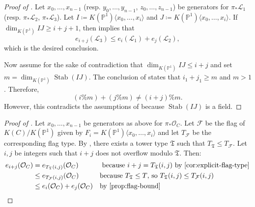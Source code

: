 \documentclass[letterpaper,10pt]{amsart}
\DeclareMathOperator{\Stab}{Stab}
\newcommand{\cO}{\mathcal{O}}      %
\newcommand{\PP}{\mathbb{P}}      %
\newcommand{\mfT}{\mathfrak{T}}
\newcommand{\la}{\langle}
\newcommand{\ra}{\rangle}
\newcommand{\cF}{\mathcal{F}}
\newcommand{\cL}{\mathcal{L}}
\theoremstyle{definition}
\theoremstyle{remark}
\begin{document}
\begin{proof}[Proof of ]
Let $x_0,\dots,x_{n-1}$ (resp. $y_0,\dots,y_{n-1}$, $z_0,\dots,z_{n-1}$) be generators for $\pi_* \cL_1$ (resp. $\pi_* \cL_2$, $\pi_* \cL_3$). Let $I \coloneqq K(\PP^1)\langle x_0,\dots,x_i\rangle$ and $J \coloneqq K(\PP^1)\langle x_0,\dots,x_i\rangle$. If $\dim_{K(\PP^1)}IJ \geq i + j + 1$, then  implies that
\[
    e_{i+j}(\cL_3) \leq e_i(\cL_1)+e_j(\cL_2),
\]
which is the desired conclusion. 

Now assume for the sake of contradiction that $\dim_{K(\PP^1)}IJ \leq i + j$ and set $m = \dim_{K(\PP^1)}\Stab(IJ)$.  The conclusion of  states that $i_1 + j_1 \geq m$ and $m > 1$. Therefore,   
\[
    (i\%m) + (j\%m) \neq (i + j)\%m.
\]
However, this contradicts the assumptions of  because $\Stab(IJ)$ is a field.
\end{proof}

\begin{proof}[Proof of ]
Let $x_0,\dots,x_{n-1}$ be generators as above for $\pi_* \cO_C$. Let $\cF$ be the flag of $K(C)/K(\PP^1)$ given by $F_i = K(\PP^1)\la x_0,\dots,x_i\ra$ and let $T_{\cF}$ be the corresponding flag type. By , there exists a tower type $\mfT$ such that $T_{\mfT} \leq T_{\cF}$. Let $i,j$ be integers such that $i+j$ does not overflow modulo $\mfT$. Then:
\begin{align*}
e_{i+j}(\cO_C) &=  e_{T_{\mfT}(i,j)}(\cO_C) && \text{ because $i+j = T_{\mfT}(i,j)$ by  \Cref{cor:explicit-flag-type}} \\
&\leq e_{T_{\cF}(i,j)}(\cO_C) && \text{because $T_{\mfT} \leq T$, so $T_{\mfT}(i,j) \leq T_{\cF}(i,j)$}\\
&\leq e_i(\cO_C)+ e_j(\cO_C) && \text{by \Cref{prop:flag-bound}}
\end{align*}
\end{proof}
\end{document}
